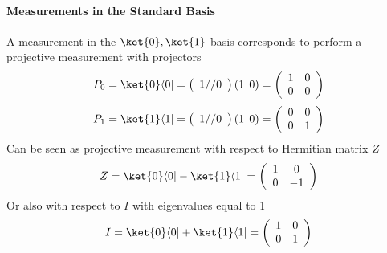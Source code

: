 \documentclass[10pt]{report}
\begin{document}
\paragraph{Measurements in the Standard Basis} A measurement in the $\ket{0}, \ket{1}$ basis corresponds to perform a projective measurement with projectors $$P_0 = \ket{0}\langle 0| = \left(\begin{array}{c}1//0\end{array}\right) (1\:\:0) = \left(\begin{array}{c c}1&0\\0&0\end{array}\right)$$
$$P_1 = \ket{1}\langle 1| = \left(\begin{array}{c}1//0\end{array}\right) (1\:\:0) = \left(\begin{array}{c c}0&0\\0&1\end{array}\right)$$
Can be seen as projective measurement with respect to Hermitian matrix $Z$
$$Z = \ket{0}\langle 0| - \ket{1}\langle 1| = \left(\begin{array}{c c}
1&0\\0&-1
\end{array}\right)$$
Or also with respect to $I$ with eigenvalues equal to 1
$$I = \ket{0}\langle 0| + \ket{1}\langle 1| = \left(\begin{array}{c c}
1&0\\0&1
\end{array}\right)$$
\end{document}
